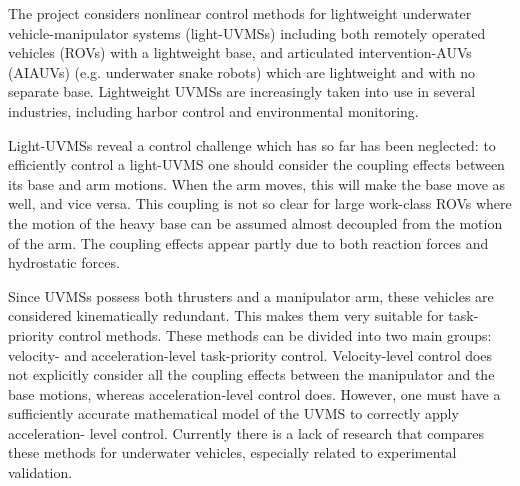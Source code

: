 The project considers nonlinear control methods for lightweight underwater vehicle-manipulator
systems (light-UVMSs) including both remotely operated vehicles (ROVs) with a lightweight
base, and articulated intervention-AUVs (AIAUVs) (e.g. underwater snake robots) which are
lightweight and with no separate base. Lightweight UVMSs are increasingly taken into use in
several industries, including harbor control and environmental monitoring.

Light-UVMSs reveal a control challenge which has so far has been neglected: to efficiently
control a light-UVMS one should consider the coupling effects between its base and arm
motions. When the arm moves, this will make the base move as well, and vice versa. This
coupling is not so clear for large work-class ROVs where the motion of the heavy base can be
assumed almost decoupled from the motion of the arm. The coupling effects appear partly due
to both reaction forces and hydrostatic forces.

Since UVMSs possess both thrusters and a manipulator arm, these vehicles are considered
kinematically redundant. This makes them very suitable for task-priority control methods. These
methods can be divided into two main groups: velocity- and acceleration-level task-priority
control. Velocity-level control does not explicitly consider all the coupling effects between the
manipulator and the base motions, whereas acceleration-level control does. However, one must
have a sufficiently accurate mathematical model of the UVMS to correctly apply acceleration-
level control. Currently there is a lack of research that compares these methods for underwater
vehicles, especially related to experimental validation.

